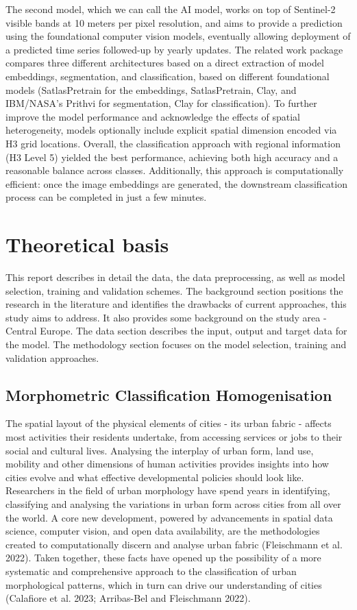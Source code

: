 \documentclass[
  letterpaper,
  DIV=11,
  numbers=noendperiod]{scrartcl}
\begin{document}
The second model, which we can call the AI model, works on top of
Sentinel-2 visible bands at 10 meters per pixel resolution, and aims to
provide a prediction using the foundational computer vision models,
eventually allowing deployment of a predicted time series followed-up by
yearly updates. The related work package compares three different
architectures based on a direct extraction of model embeddings,
segmentation, and classification, based on different foundational models
(SatlasPretrain for the embeddings, SatlasPretrain, Clay, and IBM/NASA's
Prithvi for segmentation, Clay for classification). To further improve
the model performance and acknowledge the effects of spatial
heterogeneity, models optionally include explicit spatial dimension
encoded via H3 grid locations. Overall, the classification approach with
regional information (H3 Level 5) yielded the best performance,
achieving both high accuracy and a reasonable balance across classes.
Additionally, this approach is computationally efficient: once the image
embeddings are generated, the downstream classification process can be
completed in just a few minutes.

\section{Theoretical basis}\label{theoretical-basis}

This report describes in detail the data, the data preprocessing, as
well as model selection, training and validation schemes. The background
section positions the research in the literature and identifies the
drawbacks of current approaches, this study aims to address. It also
provides some background on the study area - Central Europe. The data
section describes the input, output and target data for the model. The
methodology section focuses on the model selection, training and
validation approaches.

\subsection{Morphometric Classification
Homogenisation}\label{morphometric-classification-homogenisation}

The spatial layout of the physical elements of cities - its urban fabric
- affects most activities their residents undertake, from accessing
services or jobs to their social and cultural lives. Analysing the
interplay of urban form, land use, mobility and other dimensions of
human activities provides insights into how cities evolve and what
effective developmental policies should look like. Researchers in the
field of urban morphology have spend years in identifying, classifying
and analysing the variations in urban form across cities from all over
the world. A core new development, powered by advancements in spatial
data science, computer vision, and open data availability, are the
methodologies created to computationally discern and analyse urban
fabric (Fleischmann et al. 2022). Taken together, these facts have
opened up the possibility of a more systematic and comprehensive
approach to the classification of urban morphological patterns, which in
turn can drive our understanding of cities (Calafiore et al. 2023;
Arribas-Bel and Fleischmann 2022).
\end{document}
